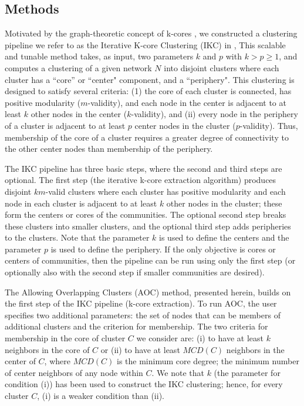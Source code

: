 \documentclass[11pt, oneside]{article}   	%
\begin{document}
\subsection{Methods} Motivated by the graph-theoretic concept of k-cores \citep{Giatsidis2011,malliaros2019}, we constructed a clustering pipeline we refer to as  the Iterative K-core Clustering (IKC) in \cite{Wedell2022}, This scalable and tunable method takes, as input, two parameters $k$ and $p$ with $k > p \geq 1$, and computes a clustering of a given network $N$ into disjoint clusters where each cluster has a ``core'' or ``center" component, and a ``periphery". This clustering is designed to satisfy several criteria: (1) the core of each cluster is connected,  has positive modularity ($m$-validity), and each node in the center  is adjacent to at least $k$ other nodes in the center ($k$-validity), and (ii) every node in the periphery of a cluster is adjacent to at least $p$ center nodes in the cluster ($p$-validity). Thus, membership of the core of a cluster requires a greater degree of connectivity to the other center nodes than membership of the periphery. 

The IKC pipeline has three basic steps, where the second and third steps are optional.  The first step (the iterative k-core extraction algorithm) produces disjoint $km$-valid clusters where each cluster has positive modularity and each node in each cluster is adjacent to at least $k$ other nodes in the cluster; these form the centers or cores of the communities. The optional second step breaks these clusters into smaller clusters, and the optional third step adds peripheries to the clusters.  Note that the parameter $k$ is used to define the centers and the parameter $p$ is used to define the periphery. If the only objective is cores or centers of communities, then the pipeline can be run using only the first step (or optionally also with the second step if smaller communities are desired).

The Allowing Overlapping Clusters (AOC) method, presented herein, builds on the first step of the IKC pipeline (k-core extraction). To run AOC, the user specifies two additional parameters:  
the set of nodes that can be members of  additional clusters and the criterion for membership.  The two criteria for membership in the core of cluster $C$ we consider are: (i) to have at least $k$ neighbors 
in the core of $C$ or (ii) to have at least $MCD(C)$ neighbors in the center of $C$, where $MCD(C)$ is the minimum core degree; the minimum number of center neighbors of any node within $C$. 
We note that $k$ (the parameter for condition (i)) has been used to construct the IKC clustering; hence, for every cluster $C$,  (i) is a weaker condition than (ii).
\end{document}

